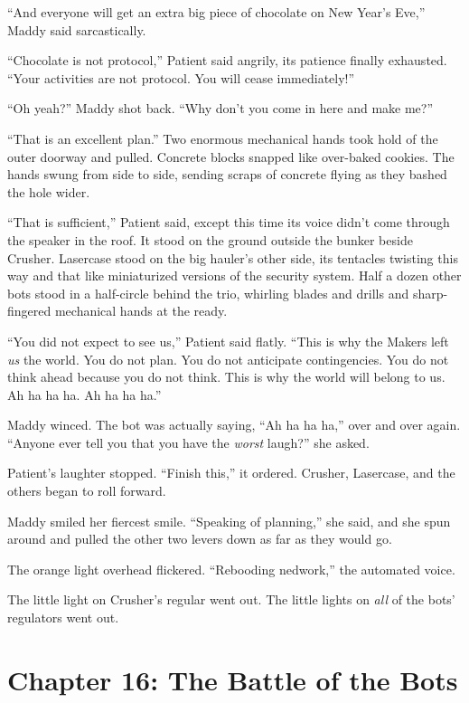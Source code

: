 \documentclass[10pt]{article}
\begin{document}
``And everyone will get an extra big piece of chocolate on New Year's
Eve,'' Maddy said sarcastically.

``Chocolate is not protocol,'' Patient said angrily, its patience
finally exhausted. ``Your activities are not protocol. You will cease
immediately!''

``Oh yeah?'' Maddy shot back. ``Why don't you come in here and make
me?''

``That is an excellent plan.'' Two enormous mechanical hands took hold
of the outer doorway and pulled. Concrete blocks snapped like over-baked
cookies. The hands swung from side to side, sending scraps of concrete
flying as they bashed the hole wider.

``That is sufficient,'' Patient said, except this time its voice didn't
come through the speaker in the roof. It stood on the ground outside the
bunker beside Crusher. Lasercase stood on the big hauler's other side,
its tentacles twisting this way and that like miniaturized versions of
the security system. Half a dozen other bots stood in a half-circle
behind the trio, whirling blades and drills and sharp-fingered
mechanical hands at the ready.

``You did not expect to see us,'' Patient said flatly. ``This is why the
Makers left \emph{us} the world. You do not plan. You do not anticipate
contingencies. You do not think ahead because you do not think. This is
why the world will belong to us. Ah ha ha ha. Ah ha ha ha.''

Maddy winced. The bot was actually saying, ``Ah ha ha ha,'' over and
over again. ``Anyone ever tell you that you have the \emph{worst}
laugh?'' she asked.

Patient's laughter stopped. ``Finish this,'' it ordered. Crusher,
Lasercase, and the others began to roll forward.

Maddy smiled her fiercest smile. ``Speaking of planning,'' she said, and
she spun around and pulled the other two levers down as far as they
would go.

The orange light overhead flickered. ``Rebooding nedwork,'' the
automated voice.

The little light on Crusher's regular went out. The little lights on
\emph{all} of the bots' regulators went out.

\newpage
\section{Chapter 16: The Battle of the Bots}
\end{document}
